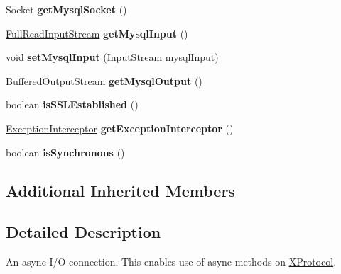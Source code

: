 \begin{DoxyCompactItemize}
Socket {\bfseries get\+Mysql\+Socket} ()
\item 
\mbox{\label{classcom_1_1mysql_1_1cj_1_1protocol_1_1x_1_1_x_async_socket_connection_a780fb96617a64cb758ef75681f6dc3ab}} 
\mbox{\hyperlink{classcom_1_1mysql_1_1cj_1_1protocol_1_1_full_read_input_stream}{Full\+Read\+Input\+Stream}} {\bfseries get\+Mysql\+Input} ()
\item 
\mbox{\label{classcom_1_1mysql_1_1cj_1_1protocol_1_1x_1_1_x_async_socket_connection_af5b71958ccff270ccc3a24afa1b3a0af}} 
void {\bfseries set\+Mysql\+Input} (Input\+Stream mysql\+Input)
\item 
\mbox{\label{classcom_1_1mysql_1_1cj_1_1protocol_1_1x_1_1_x_async_socket_connection_a233c917f720ee49857c160155fbd75dc}} 
Buffered\+Output\+Stream {\bfseries get\+Mysql\+Output} ()
\item 
\mbox{\label{classcom_1_1mysql_1_1cj_1_1protocol_1_1x_1_1_x_async_socket_connection_a312eb39f55bfb31c60beab6bb645f8c8}} 
boolean {\bfseries is\+S\+S\+L\+Established} ()
\item 
\mbox{\label{classcom_1_1mysql_1_1cj_1_1protocol_1_1x_1_1_x_async_socket_connection_a6cb71da85c0faf8459c9cc9ef3845759}} 
\mbox{\hyperlink{interfacecom_1_1mysql_1_1cj_1_1exceptions_1_1_exception_interceptor}{Exception\+Interceptor}} {\bfseries get\+Exception\+Interceptor} ()
\item 
\mbox{\label{classcom_1_1mysql_1_1cj_1_1protocol_1_1x_1_1_x_async_socket_connection_a0e10073e77bdd319bbf9346280c1dad7}} 
boolean {\bfseries is\+Synchronous} ()
\end{DoxyCompactItemize}
\subsection*{Additional Inherited Members}


\subsection{Detailed Description}
An async I/O connection. This enables use of async methods on \mbox{\hyperlink{classcom_1_1mysql_1_1cj_1_1protocol_1_1x_1_1_x_protocol}{X\+Protocol}}. 

